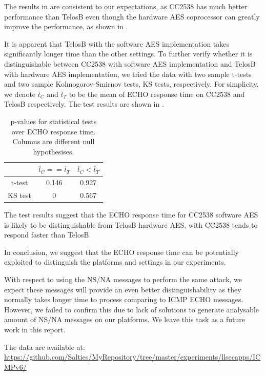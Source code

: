 The results in  are consistent to our expectations, as CC2538 has much better performance than TelosB even though the hardware AES coprocessor can greatly improve the performance, as shown in .

It is apparent that TelosB with the software AES implementation takes significantly longer time than the other settings. To further verify whether it is distinguishable between CC2538 with software AES implementation and TelosB with hardware AES implementation, we tried the data with two sample t-tests and two sample Kolmogorov-Smirnov tests, KS tests, respectively. For simplicity, we denote $\overline{t}_C$ and $\overline{t}_T$ to be the mean of ECHO response time on CC2538 and TelosB respectively. The test results are shown in .

\begin{table}[ht!]
	\center
	\begin{tabular}{|c|c|c|}
	\hline
	        & $\overline{t}_C == \overline{t}_T$ & $\overline{t}_C < \overline{t}_T$ \\ \hline
	t-test  & 0.146        & 0.927       \\ \hline
	KS test & 0            & 0.567       \\ \hline
	\end{tabular}
	\caption{p-values for statistical tests over ECHO response time. Columns are different null hypothesises.}
	\label{Tbl: p-values for statistical tests over ECHO response time}
\end{table}

The test results suggest that the ECHO response time for CC2538 software AES is likely to be distinguishable from TelosB hardware AES, with CC2538 tends to respond faster than TelosB.

In conclusion, we suggest that the ECHO response time can be potentially exploited to distinguish the platforms and settings in our experiments.

With respect to using the NS/NA messages to perform the same attack, we expect these messages will provide an even better distinguishability as they normally takes longer time to process comparing to ICMP ECHO messages. However, we failed to confirm this due to lack of solutions to generate analysable amount of NS/NA messages on our platforms. We leave this task as a future work in this report.

The data are available at: \\
\url{https://github.com/Salties/MyRepository/tree/master/experiments/llsecapps/ICMPv6/}

